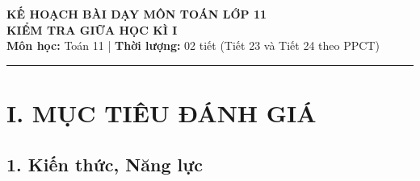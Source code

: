 \documentclass[12pt, a4paper]{article}
\begin{document}
\begin{center}
    {\Large \textbf{KẾ HOẠCH BÀI DẠY MÔN TOÁN LỚP 11}}\\[0.4em]
    {\LARGE \textbf{KIỂM TRA GIỮA HỌC KÌ I}}\\[0.5em]
    \textbf{Môn học:} Toán 11 | \textbf{Thời lượng:} 02 tiết (Tiết 23 và Tiết 24 theo PPCT)
\end{center}

\vspace{0.5em}
\hrule
\vspace{1em}

\section*{I. MỤC TIÊU ĐÁNH GIÁ}

\subsection*{1. Kiến thức, Năng lực}
\end{document}
